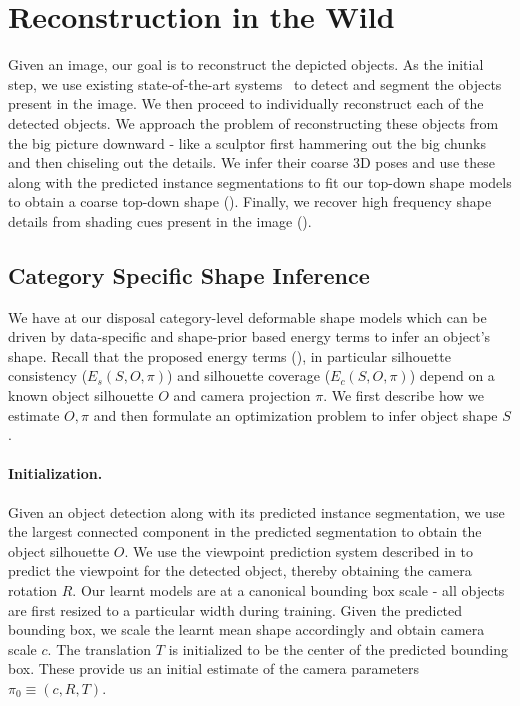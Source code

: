 \section{Reconstruction in the Wild}
Given an image, our goal is to reconstruct the depicted objects. As the initial step, we use existing state-of-the-art systems~\cite{BharathECCV2014} to detect and segment the objects present in the image. We then proceed to individually reconstruct each of the detected objects. We approach the problem of reconstructing these objects from the big picture downward - like a sculptor first hammering out the big chunks and then chiseling out the details. We infer their coarse 3D poses and use these along with the predicted instance segmentations to fit our top-down shape models to obtain a coarse top-down shape (). Finally, we recover high frequency shape details from shading cues present in the image ().

\subsection{Category Specific Shape Inference}

We have at our disposal category-level deformable shape models which can be driven by data-specific and shape-prior based energy terms to infer an object's shape.  Recall that the proposed energy terms (), in particular silhouette consistency ($E_{s}(S,O,\pi)$) and silhouette coverage ($E_{c}(S,O,\pi)$) depend on a known object silhouette $O$ and camera projection $\pi$. We first describe how we estimate $O,\pi$ and then formulate an optimization  problem to infer object shape $S$.


\paragraph{Initialization.} Given an object detection along with its predicted instance segmentation, we use the largest connected component in the predicted segmentation to obtain the object silhouette $O$. We use the viewpoint prediction system described in  to predict the viewpoint for the detected object, thereby obtaining the camera rotation $R$. Our learnt models are at a canonical bounding box scale - all objects are first resized to a particular width during training. Given the predicted bounding box, we scale the learnt mean shape accordingly and obtain camera scale $c$. The translation $T$ is initialized to be the center of the predicted bounding box. These provide us an initial estimate of the camera parameters $\pi_0 \equiv (c,R,T)$.


